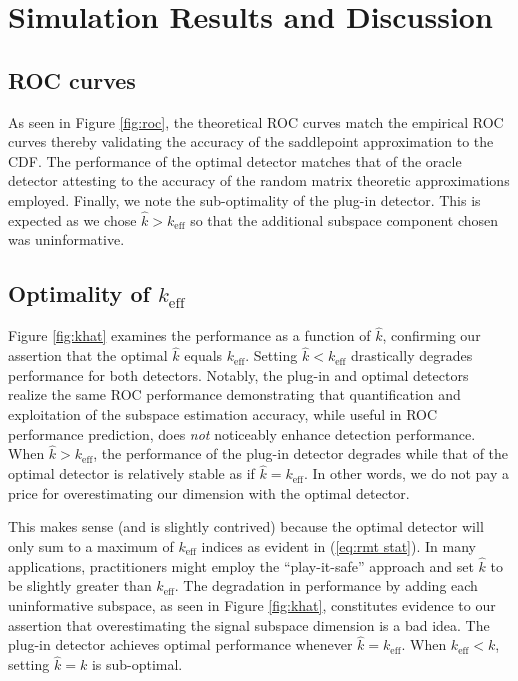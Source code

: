 \section{Simulation Results and Discussion}\label{sec:disc}

\subsection{ROC curves}
As seen in Figure \ref{fig:roc}, the theoretical ROC curves match the empirical ROC curves thereby validating the accuracy of the saddlepoint approximation to the CDF. The performance of the optimal detector matches that of the oracle detector attesting to the accuracy of the random matrix theoretic approximations employed. Finally, we note the sub-optimality of the plug-in detector. This is expected as we chose $\widehat{k} > k_\text{eff}$ so that the additional subspace component chosen was uninformative.

\subsection{Optimality of $k_\text{eff}$}
Figure \ref{fig:khat} examines the performance as a function of $\widehat{k}$, confirming our assertion that the optimal $\widehat{k}$ equals $k_\text{eff}$. Setting $\widehat{k} < k_\text{eff}$ drastically degrades performance for both detectors. Notably, the plug-in and optimal detectors realize the same ROC performance demonstrating that quantification and exploitation of the subspace estimation accuracy, while useful in ROC performance prediction, does \textit{not} noticeably enhance detection performance. When $\widehat{k} > k_\text{eff}$, the performance of the plug-in detector degrades while that of the optimal detector is relatively stable as if $\widehat{k}=k_\text{eff}$. In other words, we do not pay a price for overestimating our dimension with the optimal detector.

This makes sense (and is slightly contrived) because the optimal detector will only sum to a maximum of $k_\text{eff}$ indices as evident in (\ref{eq:rmt stat}). In many applications, practitioners might employ the ``play-it-safe'' approach and set $\widehat{k}$ to be slightly greater than $k_\text{eff}$. The degradation in performance by adding each uninformative subspace, as seen in Figure \ref{fig:khat}, constitutes evidence to our assertion that overestimating the signal subspace dimension is a bad idea. The plug-in detector achieves optimal performance whenever $\widehat{k} = k_\text{eff}$. When $k_\text{eff} < k$, setting $\widehat{k} = k$ is sub-optimal.

